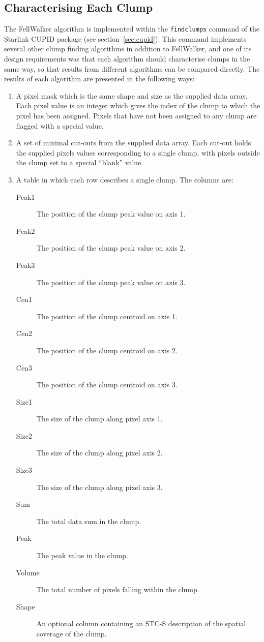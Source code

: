 \documentclass[final,authoryear,5p,times,twocolumn]{elsarticle}
\begin{document}
\subsection{Characterising Each Clump}
The FellWalker algorithm is implemented within the {\tt findclumps}
command of the Starlink CUPID package (see section~\ref{sec:cupid}). This
command implements several other clump finding algorithms in addition to
FellWalker, and one of its design requirements was that each algorithm should characterise clumps in
the same way, so that results from different algorithms can be compared
directly. The results of each algorithm are presented in the following ways:

\begin{enumerate}

\item A pixel mask which is the same shape and size as the supplied data
array. Each pixel value is an integer which gives the index of the clump
to which the pixel has been assigned. Pixels that have not been assigned
to any clump are flagged with a special value.

\item A set of minimal cut-outs from the supplied data array. Each cut-out
holds the supplied pixels values corresponding to a single clump, with pixels
outside the clump set to a special ``blank'' value.

\item A table in which each row describes a single clump. The columns are:

\begin{description}
\item[Peak1] The position of the clump peak value on axis 1.
\item[Peak2] The position of the clump peak value on axis 2.
\item[Peak3] The position of the clump peak value on axis 3.
\item[Cen1] The position of the clump centroid on axis 1.
\item[Cen2] The position of the clump centroid on axis 2.
\item[Cen3] The position of the clump centroid on axis 3.
\item[Size1] The size of the clump along pixel axis 1.
\item[Size2] The size of the clump along pixel axis 2.
\item[Size3] The size of the clump along pixel axis 3.
\item[Sum] The total data sum in the clump.
\item[Peak] The peak value in the clump.
\item[Volume] The total number of pixels falling within the clump.
\item[Shape] An optional column containing an STC-S description
\citep{2007STCS,2010ASPC..434..213B} of the spatial coverage of the clump.
\end{description}

\end{enumerate}
\end{document}
